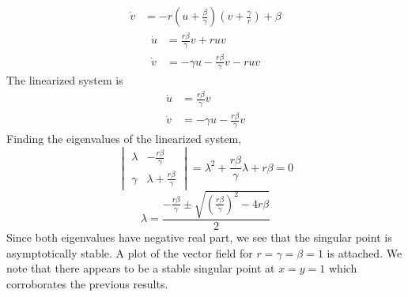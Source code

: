 \begin{Solution}
\begin{enumerate}
\begin{align*}
      \dot{v} &= -r \left(u + \frac{\beta}{\gamma} \right) \left( v + 
        \frac{\gamma}{r} \right) + \beta
    \end{align*}
    \begin{align*}
      \dot{u} &= \frac{r \beta}{\gamma} v + r u v \\
      \dot{v} &= -\gamma u - \frac{r \beta}{\gamma} v - r u v
    \end{align*}
    The linearized system is
    \begin{align*}
      \dot{u} &= \frac{r \beta}{\gamma} v \\
      \dot{v} &= -\gamma u - \frac{r \beta}{\gamma} v
    \end{align*}
    Finding the eigenvalues of the linearized system,
    \[
    \begin{vmatrix}
      \lambda      &       -\frac{r \beta}{\gamma} \\
      \gamma      &       \lambda + \frac{r \beta}{\gamma}
    \end{vmatrix}
    = \lambda^2 + \frac{r \beta}{\gamma} \lambda + r \beta = 0
    \]
    \[ \lambda = \frac{ -\frac{r \beta}{\gamma} \pm 
      \sqrt{ (\frac{r \beta}{\gamma})^2 - 4 r \beta}}{2} \]
    Since both eigenvalues have negative real part, we see that the singular
    point is asymptotically stable.
    A plot of the vector field for $r = \gamma = \beta = 1$ is attached.
    We note that there appears to be a stable singular point at $x = y = 1$
    which corroborates the previous results.
  \end{enumerate}
\end{Solution}



